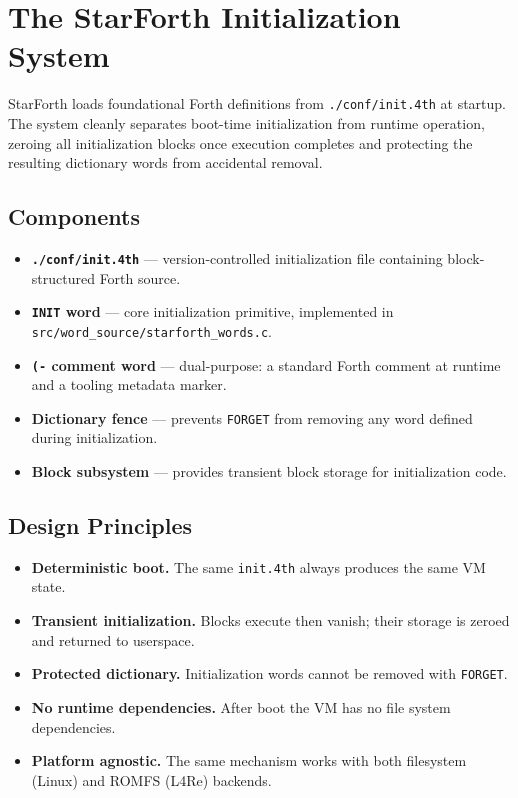 
\section{The StarForth Initialization System}

StarForth loads foundational Forth definitions from \texttt{./conf/init.4th}
at startup. The system cleanly separates boot-time initialization from
runtime operation, zeroing all initialization blocks once execution completes
and protecting the resulting dictionary words from accidental removal.

\subsection{Components}

\begin{itemize}
  \item \textbf{\texttt{./conf/init.4th}} — version-controlled initialization
        file containing block-structured Forth source.
  \item \textbf{\texttt{INIT} word} — core initialization primitive,
        implemented in \texttt{src/word\_source/starforth\_words.c}.
  \item \textbf{\texttt{(-} comment word} — dual-purpose: a standard Forth
        comment at runtime and a tooling metadata marker.
  \item \textbf{Dictionary fence} — prevents \texttt{FORGET} from removing
        any word defined during initialization.
  \item \textbf{Block subsystem} — provides transient block storage for
        initialization code.
\end{itemize}

\subsection{Design Principles}

\begin{itemize}
  \item \textbf{Deterministic boot.} The same \texttt{init.4th} always
        produces the same VM state.
  \item \textbf{Transient initialization.} Blocks execute then vanish;
        their storage is zeroed and returned to userspace.
  \item \textbf{Protected dictionary.} Initialization words cannot be
        removed with \texttt{FORGET}.
  \item \textbf{No runtime dependencies.} After boot the VM has no file
        system dependencies.
  \item \textbf{Platform agnostic.} The same mechanism works with both
        filesystem (Linux) and ROMFS (L4Re) backends.
\end{itemize}


